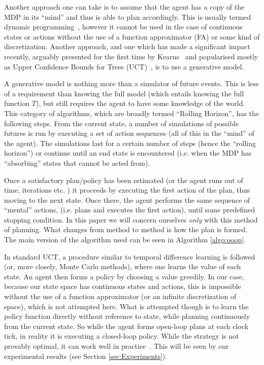 \documentclass[conference]{IEEEtran}
\begin{document}
Another approach one can take is to assume that the agent has a copy of the MDP in its ``mind'' and thus is able to plan accordingly. This is usually termed dynamic programming~\cite{sutton1998reinforcement}, however it cannot be used in the case of continuous states or actions without the use of a function approximator (FA) or some kind of discretization. Another approach, and one which has made a significant impact recently, arguably presented for the first time by Kearns~\cite{citeulike:1584916} and popularised mostly as Upper Confidence Bounds for Trees (UCT)~\cite{kocsis2006bandit}, is to use a generative model.

A generative model is nothing more than a simulator of future events. This is less of a requirement than knowing the full model (which entails knowing the full function $T$), but still requires the agent to have some knowledge of the world. This category of algorithms, which are broadly termed ``Rolling Horizon'', has the following steps. From the current state, a number of simulations of possible futures is run by executing a set of action sequences (all of this in the ``mind'' of the agent). The simulations last for a certain number of steps (hence the ``rolling horizon'') or continue until an end state is encountered (i.e. when the MDP has ``absorbing'' states that cannot be acted from).

Once a satisfactory plan/policy has been estimated (or the agent runs out of time, iterations etc. ) it proceeds by executing the first action of the plan, thus moving to the next state. Once there, the agent performs the same sequence of ``mental'' actions, (i.e. plans and executes the first action), until some predefined stopping condition.  In this paper we will concern ourselves \textit{only} with this method of planning. What changes from method to method is how the plan is formed. The main version of the algorithm used can be seen in Algorithm \ref{algo:ooop}.

In standard UCT, a procedure similar to temporal difference learning is followed (or, more closely, Monte Carlo methods), where one learns the value of each state. An agent then forms a policy by choosing a value greedily. In our case, because our state space has continuous states and actions, this is impossible without the use of a function approximator (or an infinite discretization of space), which is not attempted here. What is attempted though is to learn the policy function directly without reference to state, while planning continuously from the current state. So while the agent forms open-loop plans at each clock tick, in reality it is executing a closed-loop policy. While the strategy is not provably optimal, it can work well in practice~\cite{weinstein2012bandit}. This will be seen by our experimental results (see Section \ref{sec:Experiments}). 
\end{document}
